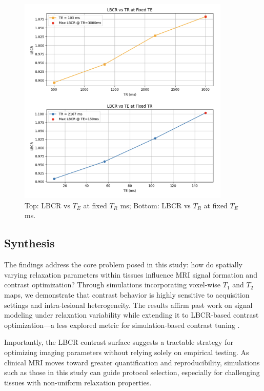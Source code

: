 \documentclass[10pt,a4paper,twoside]{article}
\begin{document}
\begin{figure}[ht]
\centering
\includegraphics[width=0.9\textwidth]{lbcrslices.png}
\caption{Top: LBCR vs \( T_E \) at fixed \( T_R \) ms; Bottom: LBCR vs \( T_R \) at fixed \( T_E \) ms.}
\label{fig:lbcrslice}
\end{figure}

\subsection{Synthesis}

The findings address the core problem posed in this study: how do spatially varying relaxation parameters within tissues influence MRI signal formation and contrast optimization? Through simulations incorporating voxel-wise \( T_1 \) and \( T_2 \) maps, we demonstrate that contrast behavior is highly sensitive to acquisition settings and intra-lesional heterogeneity. The results affirm past work on signal modeling under relaxation variability \cite{tofts2003, stanisz2005} while extending it to LBCR-based contrast optimization—a less explored metric for simulation-based contrast tuning \cite{naganawa2002}.

Importantly, the LBCR contrast surface suggests a tractable strategy for optimizing imaging parameters without relying solely on empirical testing. As clinical MRI moves toward greater quantification and reproducibility, simulations such as those in this study can guide protocol selection, especially for challenging tissues with non-uniform relaxation properties.








\end{document}
